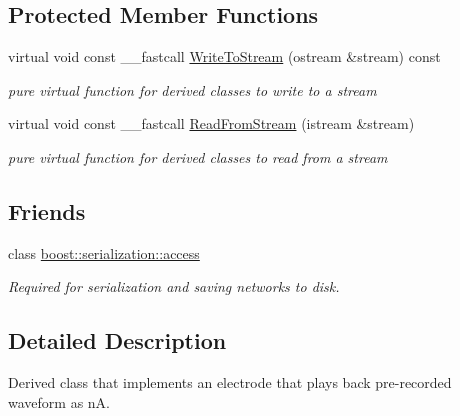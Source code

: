 \subsection*{Protected Member Functions}
\begin{DoxyCompactItemize}
\item 
\hypertarget{class_t_playback_electrode_a1babab6ab1431872259c8dc48c916919}{virtual void const \+\_\+\+\_\+fastcall \hyperlink{class_t_playback_electrode_a1babab6ab1431872259c8dc48c916919}{Write\+To\+Stream} (ostream \&stream) const }\label{class_t_playback_electrode_a1babab6ab1431872259c8dc48c916919}

\begin{DoxyCompactList}\small\item\em pure virtual function for derived classes to write to a stream \end{DoxyCompactList}\item 
\hypertarget{class_t_playback_electrode_ab022309471d8430178d9569dfc0139bc}{virtual void const \+\_\+\+\_\+fastcall \hyperlink{class_t_playback_electrode_ab022309471d8430178d9569dfc0139bc}{Read\+From\+Stream} (istream \&stream)}\label{class_t_playback_electrode_ab022309471d8430178d9569dfc0139bc}

\begin{DoxyCompactList}\small\item\em pure virtual function for derived classes to read from a stream \end{DoxyCompactList}\end{DoxyCompactItemize}
\subsection*{Friends}
\begin{DoxyCompactItemize}
\item 
\hypertarget{class_t_playback_electrode_ac98d07dd8f7b70e16ccb9a01abf56b9c}{class \hyperlink{class_t_playback_electrode_ac98d07dd8f7b70e16ccb9a01abf56b9c}{boost\+::serialization\+::access}}\label{class_t_playback_electrode_ac98d07dd8f7b70e16ccb9a01abf56b9c}

\begin{DoxyCompactList}\small\item\em Required for serialization and saving networks to disk. \end{DoxyCompactList}\end{DoxyCompactItemize}


\subsection{Detailed Description}
Derived class that implements an electrode that plays back pre-\/recorded waveform as n\+A. 

